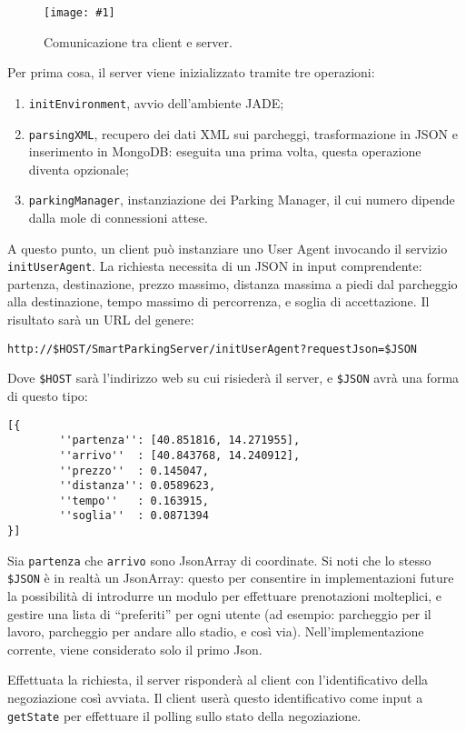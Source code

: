 \documentclass[11pt,a4paper,twoside]{article}
\numberwithin{figure}{section}
\numberwithin{equation}{section}
\newcommand{\img}[6]{
    \begin{figure}[#5]
        \centerline{\texttt{[image: \#1]}}
        \caption{#2}
        \label{#3}
    \end{figure}
}
\begin{document}
\img{workflow}{Comunicazione tra client e server.}{fig:4}{.85}{ht}

\noindent Per prima cosa, il server viene inizializzato tramite tre operazioni:
\begin{enumerate}
    \item \texttt{initEnvironment}, avvio dell'ambiente JADE;
    \item \texttt{parsingXML}, recupero dei dati XML sui parcheggi, trasformazione in JSON e inserimento in MongoDB: eseguita una prima volta, questa operazione diventa opzionale;
    \item \texttt{parkingManager}, instanziazione dei Parking Manager, il cui numero dipende dalla mole di connessioni attese.
\end{enumerate}
A questo punto, un client può instanziare uno User Agent invocando il servizio \texttt{initUserAgent}. La richiesta necessita di un JSON in input comprendente: partenza, destinazione, prezzo massimo, distanza massima a piedi dal parcheggio alla destinazione, tempo massimo di percorrenza, e soglia di accettazione. Il risultato sarà un URL del genere:

\begin{verbatim}
http://$HOST/SmartParkingServer/initUserAgent?requestJson=$JSON
\end{verbatim}
Dove \texttt{\$HOST} sarà l'indirizzo web su cui risiederà il server, e \texttt{\$JSON} avrà una forma di questo tipo:

\begin{verbatim}
[{
        ''partenza'': [40.851816, 14.271955],
        ''arrivo''  : [40.843768, 14.240912],
        ''prezzo''  : 0.145047,
        ''distanza'': 0.0589623,
        ''tempo''   : 0.163915,
        ''soglia''  : 0.0871394
}]
\end{verbatim}

Sia \texttt{partenza} che \texttt{arrivo} sono \textsf{JsonArray} di coordinate.
Si noti che lo stesso \texttt{\$JSON} è in realtà un \textsf{JsonArray}: questo per consentire in implementazioni future la possibilità di introdurre un modulo per effettuare prenotazioni molteplici, e gestire una lista di ``preferiti'' per ogni utente (ad esempio: parcheggio per il lavoro, parcheggio per andare allo stadio, e così via).
Nell'implementazione corrente, viene considerato solo il primo \textsf{Json}.

Effettuata la richiesta, il server risponderà al client con l'identificativo della negoziazione così avviata. Il client userà questo identificativo come input a \texttt{getState} per effettuare il polling sullo stato della negoziazione.
\end{document}

